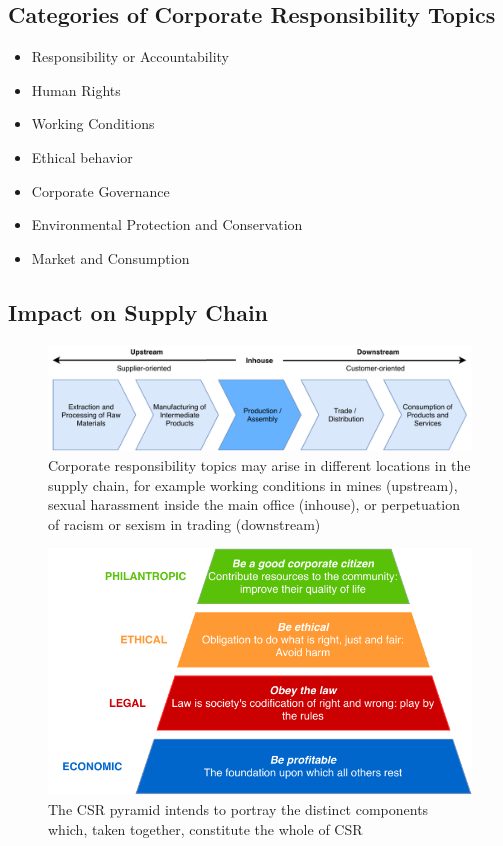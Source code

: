 \documentclass[11pt]{article}
\theoremstyle{definition}
\begin{document}
\subsection{Categories of Corporate Responsibility Topics}
\begin{itemize}
	\item Responsibility or Accountability
	\item Human Rights
	\item Working Conditions
	\item Ethical behavior
	\item Corporate Governance
	\item Environmental Protection and Conservation
	\item Market and Consumption
\end{itemize}

\subsection{Impact on Supply Chain}

\begin{figure}[H]
	\centering
	\includegraphics[width=0.85\linewidth]{img/corporate_responsibility_stages.pdf}
	\caption{Corporate responsibility topics may arise in different locations in the supply chain, for example working conditions in mines (upstream), sexual harassment inside the main office (inhouse), or perpetuation of racism or sexism in trading (downstream)}
\end{figure}

\begin{figure}[htb]
	\centering
	\includegraphics[width=0.7\linewidth]{img/caroll_pyramid_corporate_responsibility.pdf}
	\caption{The CSR pyramid intends to portray the distinct components which, taken together, constitute the whole of CSR \parencite{caroll1991pyramid}}
\end{figure}
\end{document}
